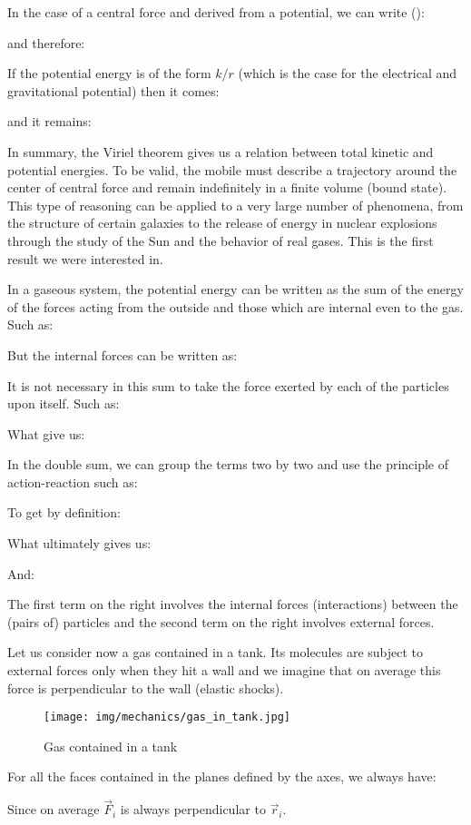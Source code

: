 	In the case of a central force and derived from a potential, we can write ():
	
	and therefore:
	
	If the potential energy is of the form $k / r$ (which is the case for the electrical and gravitational potential) then it comes:
	
	and it remains:
	
	In summary, the Viriel theorem gives us a relation between total kinetic and potential energies. To be valid, the mobile must describe a trajectory around the center of central force and remain indefinitely in a finite volume (bound state). This type of reasoning can be applied to a very large number of phenomena, from the structure of certain galaxies to the release of energy in nuclear explosions through the study of the Sun and the behavior of real gases. This is the first result we were interested in.

	In a gaseous system, the potential energy can be written as the sum of the energy of the forces acting from the outside and those which are internal even to the gas. Such as:
	
	But the internal forces can be written as:
	
	It is not necessary in this sum to take the force exerted by each of the particles upon itself. Such as:
	
	What give us:
	
	In the double sum, we can group the terms two by two and use the principle of action-reaction such as:
	
	To get by definition:
	
	What ultimately gives us:
	
	And:
	
	The first term on the right involves the internal forces (interactions) between the (pairs of) particles and the second term on the right involves external forces.

	Let us consider now a gas contained in a tank. Its molecules are subject to external forces only when they hit a wall and we imagine that on average this force is perpendicular to the wall (elastic shocks).
	\begin{figure}[H]
		\centering
		\texttt{[image: img/mechanics/gas\_in\_tank.jpg]}
		\caption{Gas contained in a tank}
	\end{figure}
	For all the faces contained in the planes defined by the axes, we always have:
	
	Since on average $\vec{F}_i$ is always perpendicular to $\vec{r}_i$.

